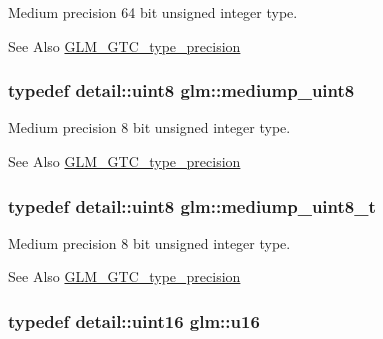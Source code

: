 Medium precision 64 bit unsigned integer type. \begin{DoxySeeAlso}{See Also}
\hyperlink{group__gtc__type__precision}{G\-L\-M\-\_\-\-G\-T\-C\-\_\-type\-\_\-precision} 
\end{DoxySeeAlso}
\hypertarget{group__gtc__type__precision_gac4b849eaac0543a10f97f4bdda4850a8}{
\subsubsection[{mediump\-\_\-uint8}]{\setlength{\rightskip}{0pt plus 5cm}typedef detail\-::uint8 {\bf glm\-::mediump\-\_\-uint8}}}\label{group__gtc__type__precision_gac4b849eaac0543a10f97f4bdda4850a8}
Medium precision 8 bit unsigned integer type. \begin{DoxySeeAlso}{See Also}
\hyperlink{group__gtc__type__precision}{G\-L\-M\-\_\-\-G\-T\-C\-\_\-type\-\_\-precision} 
\end{DoxySeeAlso}
\hypertarget{group__gtc__type__precision_gadfa38f3c245d371c4b2079f1fd68928b}{
\subsubsection[{mediump\-\_\-uint8\-\_\-t}]{\setlength{\rightskip}{0pt plus 5cm}typedef detail\-::uint8 {\bf glm\-::mediump\-\_\-uint8\-\_\-t}}}\label{group__gtc__type__precision_gadfa38f3c245d371c4b2079f1fd68928b}
Medium precision 8 bit unsigned integer type. \begin{DoxySeeAlso}{See Also}
\hyperlink{group__gtc__type__precision}{G\-L\-M\-\_\-\-G\-T\-C\-\_\-type\-\_\-precision} 
\end{DoxySeeAlso}
\hypertarget{group__gtc__type__precision_gae7a1571503f83d2264ddfa705a6b082a}{
\subsubsection[{u16}]{\setlength{\rightskip}{0pt plus 5cm}typedef detail\-::uint16 {\bf glm\-::u16}}}\label{group__gtc__type__precision_gae7a1571503f83d2264ddfa705a6b082a}
